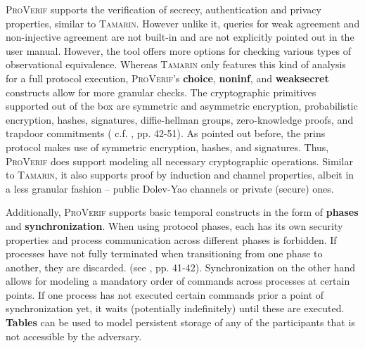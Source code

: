 \textsc{ProVerif} supports the verification of secrecy, authentication and privacy properties, similar to \textsc{Tamarin}.
However unlike it, queries for weak agreement and non-injective agreement are not built-in and are not explicitly pointed out in the user manual.
However, the tool offers more options for checking various types of observational equivalence.
Whereas \textsc{Tamarin} only features this kind of analysis for a full protocol execution, \textsc{ProVerif}'s \textbf{choice}, \textbf{noninf}, and \textbf{weaksecret} constructs allow for more granular checks. 
The cryptographic primitives supported out of the box are symmetric and asymmetric encryption, probabilistic encryption, hashes, signatures, diffie-hellman groups,
zero-knowledge proofs, and trapdoor commitments ( c.f. \cite{blanchet2020proverif}, pp. 42-51).
As pointed out before, the \gls{prins} protocol makes use of symmetric encryption, hashes, and signatures.
Thus, \textsc{ProVerif} does support modeling all necessary cryptographic operations.
Similar to \textsc{Tamarin}, it also supports proof by induction and channel properties, albeit in a less granular fashion -- public Dolev-Yao channels or private (secure) ones.

Additionally, \textsc{ProVerif} supports basic temporal constructs in the form of \textbf{phases} and \textbf{synchronization}.
When using protocol phases, each has its own security properties and process communication across different phases is forbidden.
If processes have not fully terminated when transitioning from one phase to another, they are discarded. (see \cite{blanchet2020proverif}, pp. 41-42).
Synchronization on the other hand allows for modeling a mandatory order of commands across processes at certain points.
If one process has not executed certain commands prior a point of synchronization yet, it waits (potentially indefinitely) until these are executed.
\textbf{Tables} can be used to model persistent storage of any of the participants that is not accessible by the adversary.